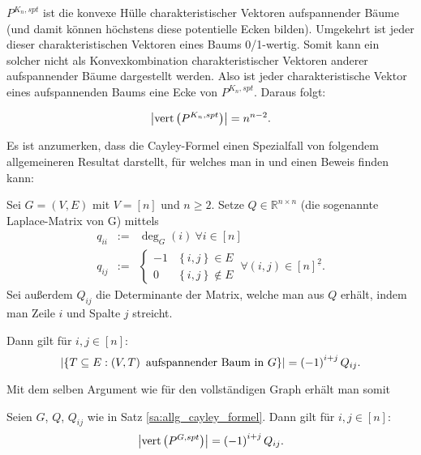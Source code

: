 \documentclass[10p,a4paper,BCOR = 12mm, DIV=15]{scrbook}
\begin{document}
$P^{K_n, spt}$ ist die konvexe Hülle charakteristischer Vektoren aufspannender Bäume (und damit können höchstens diese potentielle Ecken bilden). Umgekehrt ist jeder dieser charakteristischen Vektoren eines Baums 0/1-wertig. Somit kann ein solcher nicht als Konvexkombination charakteristischer Vektoren anderer aufspannender Bäume dargestellt werden. Also ist jeder charakteristische Vektor eines aufspannenden Baums eine Ecke von $P^{K_n, spt}$. Daraus folgt:
\begin{Kor}
\begin{displaymath}
\left|\operatorname{vert} \left(P^{K_n, spt}\right)\right| = n^{n-2}.
\end{displaymath}
\end{Kor}

Es ist anzumerken, dass die Cayley-Formel einen Spezialfall von folgendem allgemeineren Resultat darstellt, für welches man in \citep{matousek2007diskrete} und \cite{lovasz_combinatorics} einen Beweis finden kann:
\begin{Sa}
\label{sa:allg_cayley_formel}
Sei $G=\left(V, E\right)$ mit $V = \left[n\right]$ und $n \geq 2$. Setze $Q\in \mathbb{R}^{n \times n}$ (die sogenannte Laplace-Matrix von G) mittels
\begin{eqnarray*}
q_{i i} & := & \deg_G\left(i\right)\ \forall i \in \left[n\right] \\
q_{i j} & := & \begin{cases}
-1 & \left\{i, j\right\} \in E \\
0 & \left\{i, j\right\} \notin E
\end{cases}\ \forall \left(i, j\right) \in \left[n\right]^{\underline{2}}.
\end{eqnarray*}
Sei außerdem $Q_{i j}$ die Determinante der Matrix, welche man aus $Q$ erhält, indem man Zeile $i$ und Spalte $j$ streicht.

Dann gilt für $i, j \in \left[n\right]$:
\begin{displaymath}
\left|\left\{T \subseteq E: \left(V, T\right)\textnormal{ aufspannender Baum in }G\right\}\right| = \left(-1\right)^{i+j} Q_{i j}.
\end{displaymath}
\end{Sa}

Mit dem selben Argument wie für den vollständigen Graph erhält man somit
\begin{Kor}
Seien $G$, $Q$, $Q_{i j}$ wie in Satz \ref{sa:allg_cayley_formel}. Dann gilt für $i, j \in \left[n\right]$:
\begin{displaymath}
\left|\operatorname{vert} \left(P^{G, spt}\right)\right| = \left(-1\right)^{i+j} Q_{i j}.
\end{displaymath}
\end{Kor}
\end{document}

